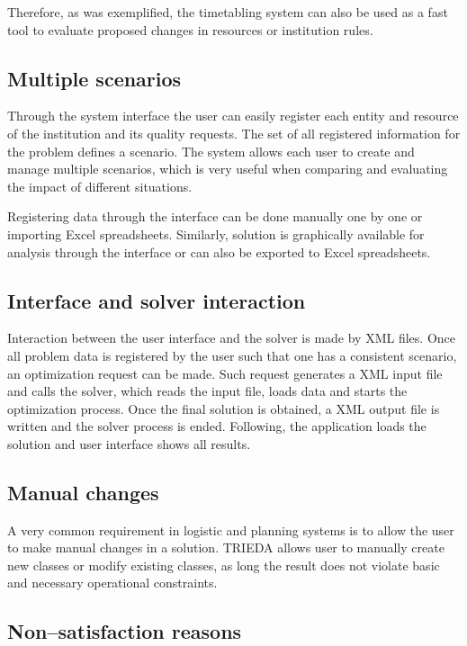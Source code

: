 Therefore, as was exemplified, the timetabling system can also be used as a fast  tool to evaluate proposed changes in resources or institution rules.


\subsection{Multiple scenarios}
\label{subsec:scenarios}

Through the system interface the user can easily register each entity and resource of the institution and its quality requests. The set of all registered information for the problem defines a scenario. The system allows each user to create and manage multiple scenarios, which is very useful when comparing and evaluating the impact of different situations.

Registering data through the interface can be done manually one by one or importing Excel spreadsheets. Similarly, solution is graphically available for analysis through the interface or can also be exported to Excel spreadsheets.


\subsection{Interface and solver interaction}
\label{subsec:interaction}

Interaction between the user interface and the solver is made by XML files. Once all problem data is registered by the user such that one has a consistent scenario, an optimization request can be made. Such request generates a XML input file and calls the solver, which reads the input file, loads data and starts the optimization process. Once the final solution is obtained, a XML output file is written and the solver process is ended. Following, the application loads the solution and user interface shows all results.


\subsection{Manual changes}
\label{subsec:manual}

A very common requirement in logistic and planning systems is to allow the user to make manual changes in a solution. TRIEDA allows user to manually create new classes or modify existing classes, as long the result does not violate basic and necessary operational constraints.


\subsection{Non--satisfaction reasons}
\label{subsec:reasons}

